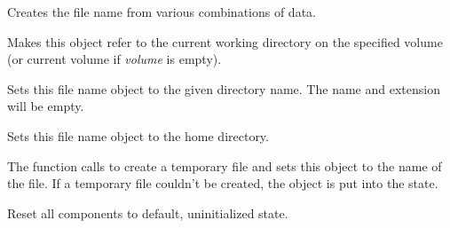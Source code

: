 
Creates the file name from various combinations of data.

\label{wxfilenameassigncwd}


Makes this object refer to the current working directory on the specified
volume (or current volume if {\it volume} is empty).



\label{wxfilenameassigndir}


Sets this file name object to the given directory name. The name and extension
will be empty.

\label{wxfilenameassignhomedir}


Sets this file name object to the home directory.

\label{wxfilenameassigntempfilename}


The function calls  to
create a temporary file and sets this object to the name of the file. If a
temporary file couldn't be created, the object is put into the\rtfsp
{} state.

\label{wxfilenameclear}


Reset all components to default, uninitialized state.

\label{wxfilenamecreatetempfilename}


